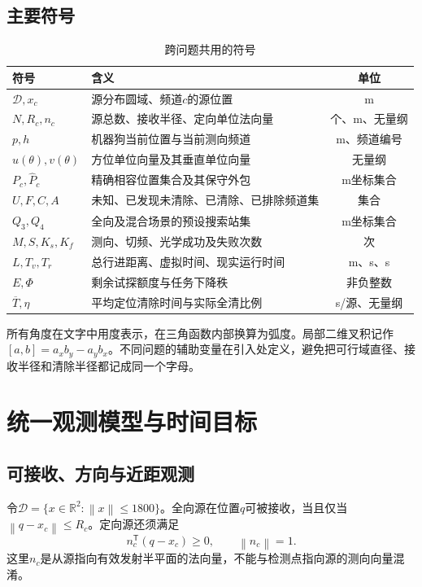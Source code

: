 \documentclass[UTF8,a4paper,12pt,fontset=fandol]{ctexart}
\newcommand{\R}{\mathbb R}
\newcommand{\norm}[1]{\left\lVert#1\right\rVert}
\newcommand{\nextpage}{\clearpage}
\begin{document}
\subsection{主要符号}
\begin{table}[H]\centering\caption{跨问题共用的符号}\small
\begin{tabularx}{\linewidth}{p{.24\linewidth}Yc}\toprule
符号 & 含义 & 单位\\\midrule
$\mathcal D,x_c$ & 源分布圆域、频道$c$的源位置 & m\\
$N,R_c,n_c$ & 源总数、接收半径、定向单位法向量 & 个、m、无量纲\\
$p,h$ & 机器狗当前位置与当前测向频道 & m、频道编号\\
$u(\theta),v(\theta)$ & 方位单位向量及其垂直单位向量 & 无量纲\\
$P_c,\widehat P_c$ & 精确相容位置集合及其保守外包 & m坐标集合\\
$U,F,C,A$ & 未知、已发现未清除、已清除、已排除频道集 & 集合\\
$Q_3,Q_4$ & 全向及混合场景的预设搜索站集 & m坐标集合\\
$M,S,K_s,K_f$ & 测向、切频、光学成功及失败次数 & 次\\
$L,T_v,T_r$ & 总行进距离、虚拟时间、现实运行时间 & m、s、s\\
$E,\Phi$ & 剩余试探额度与任务下降秩 & 非负整数\\
$\overline T,\eta$ & 平均定位清除时间与实际全清比例 & s/源、无量纲\\\bottomrule
\end{tabularx}\end{table}

所有角度在文字中用度表示，在三角函数内部换算为弧度。局部二维叉积记作$[a,b]=a_xb_y-a_yb_x$。不同问题的辅助变量在引入处定义，避免把可行域直径、接收半径和清除半径都记成同一个字母。

\nextpage
\section{统一观测模型与时间目标}
\subsection{可接收、方向与近距观测}
令$\mathcal D=\{x\in\R^2:\norm{x}\le1800\}$。全向源在位置$q$可被接收，当且仅当$\norm{q-x_c}\le R_c$。定向源还须满足
\begin{equation}\label{eq:detect}
 n_c^\mathsf T(q-x_c)\ge0,\qquad \norm{n_c}=1.
\end{equation}
这里$n_c$是从源指向有效发射半平面的法向量，不能与检测点指向源的测向向量混淆。
\end{document}
